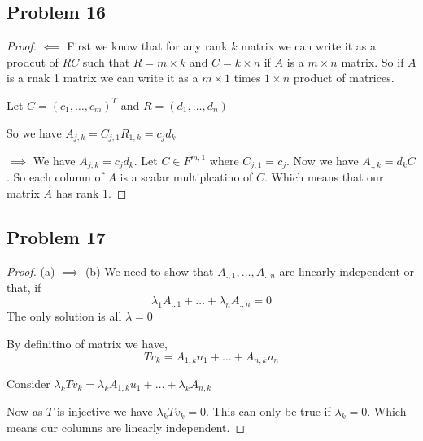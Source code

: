 \documentclass[a4paper]{report}
\begin{document}
\subsection*{Problem 16}
\begin{proof}
    $\impliedby$
    First we know that for any rank $k$ matrix we can write it as a prodcut of $RC$ such that $R = m \times  k$ and $C =k \times  n$ if $A$ is a $m \times n$ matrix. So if $A$ is a rnak 1 matrix we can write it as a $m \times  1$ times $1 \times n $ product of matrices.

    Let $C = (c_1,\dots,c_m)^{T}$ and $R = (d_1,\dots,d_n)$

    So we have $A_{j,k} = C_{j,1}R_{1,k} = c_jd_k$

    $\implies$
    We have $A_{j,k} = c_jd_k$. Let  $C \in F^{m,1}$ where $C_{j,1} = c_j$. Now we have  $A_{.,k} = d_k C$. So each column of  $A$ is a scalar multiplcatino of $C$. Which means that our matrix $A$ has rank 1.
\end{proof}



\subsection*{Problem 17}
\begin{proof}
    (a) $\implies$ (b)
    We need to show that $A_{.,1},\dots,A_{.,n}$ are linearly independent or that, if  
    $$ \lambda_1A_{.,1}  + \dots + \lambda_n A_{.,n} = 0$$ The only solution is all  $\lambda= 0$

    By definitino of matrix we have,  
    $$ Tv_k= A_{1,k}u_1 + \dots + A_{n,k}u_n $$ 

    Consider $\lambda_k Tv_k = \lambda_k A_{1,k}u_1 + \dots + \lambda_k A_{n,k}$ 

    Now as $T$ is injective we have $\lambda_k T v_k = 0$. This can only be true if $\lambda_k = 0$. Which means our columns are linearly independent.
\end{proof} 
\end{document}
